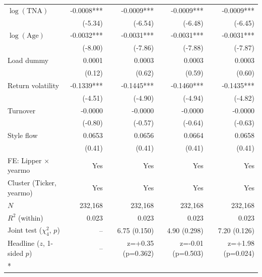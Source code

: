\begin{ThreePartTable}
\begin{longtable}[t]{@{\extracolsep{\fill}}lrrrr}
$\log(\text{TNA})$ & -0.0008*** & -0.0009*** & -0.0009*** & -0.0009***\\
 & (-5.34) & (-6.54) & (-6.48) & (-6.45)\\
$\log(\text{Age})$ & -0.0032*** & -0.0031*** & -0.0031*** & -0.0031***\\
 & (-8.00) & (-7.86) & (-7.88) & (-7.87)\\
Load dummy & 0.0001 & 0.0003 & 0.0003 & 0.0003\\
 & (0.12) & (0.62) & (0.59) & (0.60)\\
Return volatility & -0.1339*** & -0.1445*** & -0.1460*** & -0.1435***\\
 & (-4.51) & (-4.90) & (-4.94) & (-4.82)\\
Turnover & -0.0000 & -0.0000 & -0.0000 & -0.0000\\
 & (-0.80) & (-0.57) & (-0.64) & (-0.63)\\
Style flow & 0.0653 & 0.0656 & 0.0664 & 0.0658\\
 & (0.41) & (0.41) & (0.41) & (0.41)\\
\midrule
FE: Lipper $\times$ yearmo & Yes & Yes & Yes & Yes\\
Cluster (Ticker, yearmo) & Yes & Yes & Yes & Yes\\
$N$ & 232,168 & 232,168 & 232,168 & 232,168\\
$R^2$ (within) & 0.023 & 0.023 & 0.023 & 0.023\\
Joint test ($\chi^2_4$, $p$) & -- & 6.75 (0.150) & 4.90 (0.298) & 7.20 (0.126)\\
Headline ($z$, 1-sided $p$) & -- & z=+0.35 (p=0.362) & z=-0.01 (p=0.503) & z=+1.98 (p=0.024)\\*
\end{longtable}
\end{ThreePartTable}
\endgroup{}

